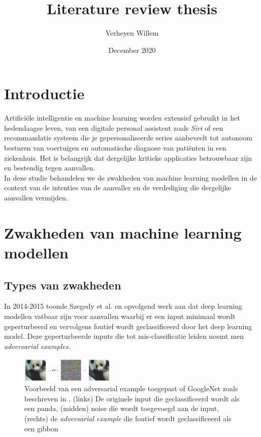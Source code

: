 \documentclass{article}
\title{Literature review thesis}
\author{Verheyen Willem}
\date{December 2020}
\begin{document}
\maketitle
\begin{multicols*}{2}

\section{Introductie}

Artificiële intelligentie en machine learning worden extensief gebruikt in het hedendaagse leven, van een digitale personal assistent zoals \textit{Siri} of een recommandatie systeem die je gepersonaliseerde series aanbeveelt tot autonoom besturen van voertuigen en automatische diagnose van patiënten in een ziekenhuis. Het is belangrijk dat dergelijke kritieke applicaties betrouwbaar zijn en bestendig tegen aanvallen. \\
In deze studie behandelen we de zwakheden van machine learning modellen in de context van de intenties van de aanvaller en de verdediging die dergelijke aanvallen vermijden. 

\section{Zwakheden van machine learning modellen}
\subsection{Types van zwakheden}
In 2014-2015 toonde Szegedy et al. \cite{szegedy2014intriguing} en opvolgend werk \cite{goodfellow2015explaining} aan dat deep learning modellen vatbaar zijn voor aanvallen waarbij er een input minimaal wordt geperturbeerd en vervolgens foutief wordt geclassificeerd door het deep learning model. Deze geperturbeerde inputs die tot mis-classificatie leiden noemt men \textit{adversarial examples}.

\begin{figure}[H]
    \centering
    \includegraphics[width=0.4\textwidth]{panda_expl.png}
    \caption{Voorbeeld van een adversarial example toegepast of GoogleNet zoals beschreven in \cite{goodfellow2015explaining}. (links) De originele input die geclassificeerd wordt als een panda, (midden) noise die wordt toegevoegd aan de input, (rechts) de \textit{adversarial example} die foutief wordt geclassificeerd als een gibbon}
    \label{fig:adv_ex}
\end{figure}


\end{multicols*}
\end{document}
